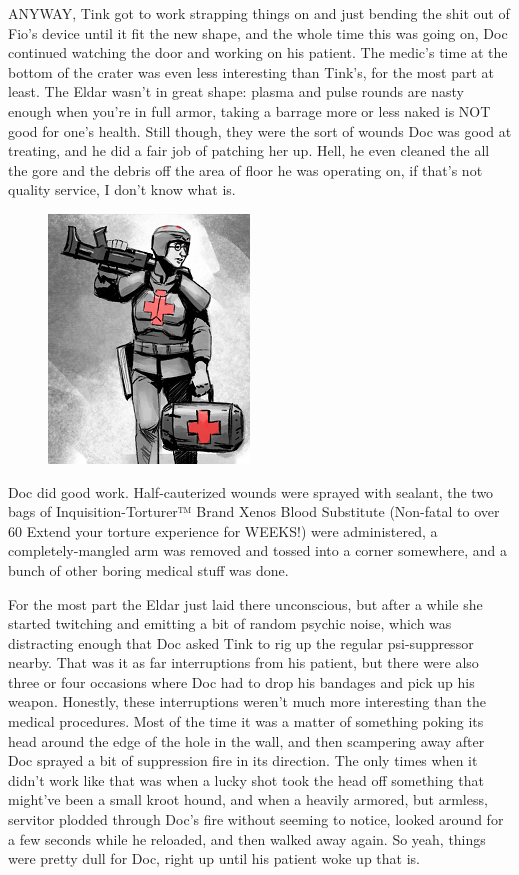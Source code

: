 ANYWAY, Tink got to work strapping things on and just bending the shit out of Fio's device until it fit the new shape, and the whole time this was going on, Doc continued watching the door and working on his patient. 
The medic's time at the bottom of the crater was even less interesting than Tink's, for the most part at least. 
The Eldar wasn't in great shape: 
plasma and pulse rounds are nasty enough when you're in full armor, taking a barrage more or less naked is NOT good for one's health. 
Still though, they were the sort of wounds Doc was good at treating, and he did a fair job of patching her up. 
Hell, he even cleaned the all the gore and the debris off the area of floor he was operating on, if that's not quality service, I don't know what is.

\begin{figure}
	\begin{center}
		\includegraphics[width=\figwidth]{pics/16/37.png}
	\end{center}
\end{figure}
Doc did good work. 
Half-cauterized wounds were sprayed with sealant, the two bags of Inquisition-Torturer™ Brand Xenos Blood Substitute (Non-fatal to over 60%
Extend your torture experience for WEEKS!) were administered, a completely-mangled arm was removed and tossed into a corner somewhere, and a bunch of other boring medical stuff was done.

For the most part the Eldar just laid there unconscious, but after a while she started twitching and emitting a bit of random psychic noise, which was distracting enough that Doc asked Tink to rig up the regular psi-suppressor nearby. 
That was it as far interruptions from his patient, but there were also three or four occasions where Doc had to drop his bandages and pick up his weapon. 
Honestly, these interruptions weren't much more interesting than the medical procedures. 
Most of the time it was a matter of something poking its head around the edge of the hole in the wall, and then scampering away after Doc sprayed a bit of suppression fire in its direction. 
The only times when it didn't work like that was when a lucky shot took the head off something that might've been a small kroot hound, and when a heavily armored, but armless, servitor plodded through Doc's fire without seeming to notice, looked around for a few seconds while he reloaded, and then walked away again. 
So yeah, things were pretty dull for Doc, right up until his patient woke up that is.

